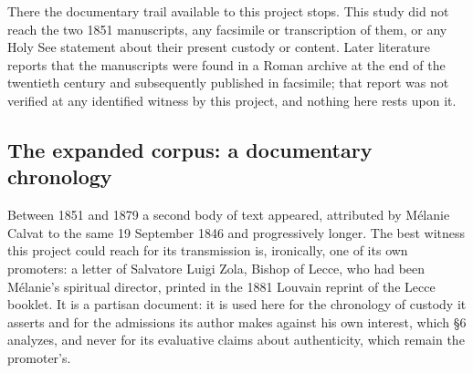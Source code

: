 There the documentary trail available to this project stops. This
study did not reach the two 1851 manuscripts, any facsimile or
transcription of them, or any Holy See statement about their present
custody or content. Later literature reports that the manuscripts
were found in a Roman archive at the end of the twentieth century
and subsequently published in facsimile; that report was not
verified at any identified witness by this project, and nothing here
rests upon it.

\subsection{The expanded corpus: a documentary chronology}

Between 1851 and 1879 a second body of text appeared, attributed by
Mélanie Calvat to the same 19 September 1846 and progressively
longer. The best witness this project could reach for its
transmission is, ironically, one of its own promoters: a letter of
Salvatore Luigi Zola, Bishop of Lecce, who had been Mélanie's
spiritual director, printed in the 1881 Louvain reprint of the Lecce
booklet. It is a partisan document: it is used here for the
chronology of custody it asserts and for the admissions its author
makes against his own interest, which \S6 analyzes, and never for
its evaluative claims about authenticity, which remain the
promoter's.

